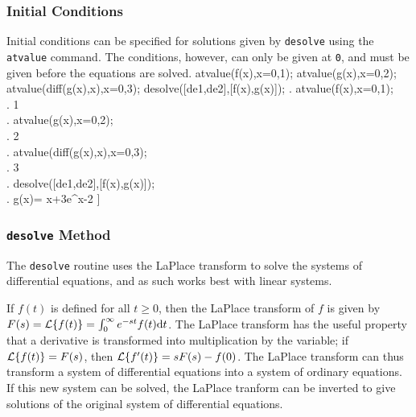 \documentclass{article}
\begin{document}
\subsubsection{Initial Conditions}

Initial conditions can be specified for solutions given by
\texttt{desolve} using the \texttt{atvalue} command.
The conditions, however, can only be given at \texttt{0}, and
must be given before the equations are solved.
\beginmaximasession
atvalue(f(x),x=0,1);
atvalue(g(x),x=0,2);
atvalue(diff(g(x),x),x=0,3);
desolve([de1,de2],[f(x),g(x)]);
\maximatexsession
{}.  atvalue(f(x),x=0,1); \\
.   1 \\
.  atvalue(g(x),x=0,2); \\
.   2 \\
.  atvalue(diff(g(x),x),x=0,3); \\
.   3 \\
.  desolve([de1,de2],[f(x),g(x)]); \\
.   \left[ f\left(x\right)=3\*e^{x}-2,\linebreak[0]g\left(x\right)=
 \cos x+3\*e^{x}-2 \right]  \\
\endmaximasession

\subsubsection{\texttt{desolve} Method}

The \texttt{desolve} routine uses the LaPlace transform to solve the
systems of differential equations, and as such works best with linear
systems. 

If $f(t)$ is defined for all $t \ge 0$, then the LaPlace transform of
$f$ is given by $F(s)={\cal L}\{f(t)\} = \int_0^\infty
e^{-st}f(t)\textrm{d}t$.   The LaPlace transform has the useful
property that a derivative is transformed into multiplication by the
variable; if ${\cal L}\{f(t)\} = F(s)$, then 
${\cal L}\{f'(t)\} = sF(s)-f(0)$.  The LaPlace transform can thus
transform a system of differential equations into a system of ordinary
equations.  If this new system can be solved, the LaPlace
tranform can be inverted to give solutions of the original system of
differential equations.
\end{document}
